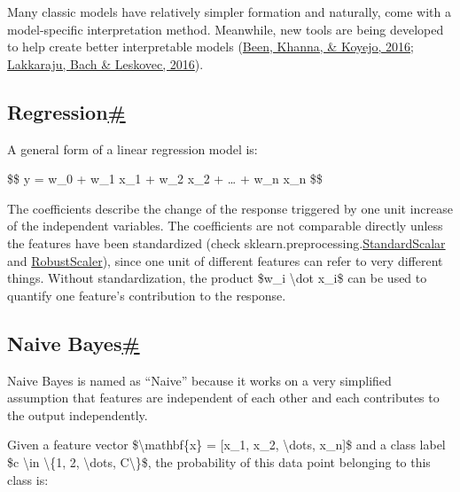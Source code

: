 Many classic models have relatively simpler formation and naturally, come with a model-specific interpretation method. Meanwhile, new tools are being developed to help create better interpretable models (\href{http://papers.nips.cc/paper/6300-examples-are-not-enough-learn-to-criticize-criticism-for-interpretability.pdf}{Been, Khanna, \& Koyejo, 2016}; \href{http://www.kdd.org/kdd2016/papers/files/rpp1067-lakkarajuA.pdf}{Lakkaraju, Bach \& Leskovec, 2016}).

\subsection{\texorpdfstring{Regression\hyperref[regression]{\#}}{Regression\#}}\label{regression}

A general form of a linear regression model is:

\$\$ y = w\_0 + w\_1 x\_1 + w\_2 x\_2 + \ldots{} + w\_n x\_n \$\$

The coefficients describe the change of the response triggered by one unit increase of the independent variables. The coefficients are not comparable directly unless the features have been standardized (check sklearn.preprocessing.\href{http://scikit-learn.org/stable/modules/generated/sklearn.preprocessing.StandardScaler.html\#sklearn.preprocessing.StandardScaler}{StandardScalar} and \href{http://scikit-learn.org/stable/modules/generated/sklearn.preprocessing.RobustScaler.html\#sklearn.preprocessing.RobustScaler}{RobustScaler}), since one unit of different features can refer to very different things. Without standardization, the product \$w\_i \textbackslash dot x\_i\$ can be used to quantify one feature's contribution to the response.

\subsection{\texorpdfstring{Naive Bayes\hyperref[naive-bayes]{\#}}{Naive Bayes\#}}\label{naive-bayes}

Naive Bayes is named as ``Naive'' because it works on a very simplified assumption that features are independent of each other and each contributes to the output independently.

Given a feature vector \$\textbackslash mathbf\{x\} = {[}x\_1, x\_2, \textbackslash dots, x\_n{]}\$ and a class label \$c \textbackslash in \textbackslash\{1, 2, \textbackslash dots, C\textbackslash\}\$, the probability of this data point belonging to this class is:

